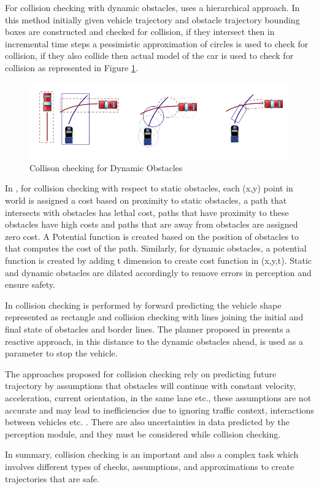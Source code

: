 For collision checking with dynamic obstacles, \cite{kolski_thesis} uses a hierarchical approach. In this method initially given vehicle trajectory and obstacle trajectory bounding boxes are constructed and checked for collision, if they intersect then in incremental time steps a pessimistic approximation of circles is used to check for collision, if they also collide then actual model of the car is used to check for collision as represented in Figure \ref{kolskidynamicobst}.

\begin{figure}
	\centering
	\includegraphics[width=1.0\textwidth]{Images/related_work/kolskidynamicobstacles.png}
	\caption{Collison checking for Dynamic Obstacles \cite{kolski_thesis}}
	\label{kolskidynamicobst}
\end{figure} 

In \cite{cmu_parallel_thesis}, for collision checking with respect to static obstacles, each (x,y) point in world is assigned a cost based on proximity to static obstacles, a path that intersects with obstacles has lethal cost, paths that have proximity to these obstacles have high costs and paths that are away from obstacles are assigned zero cost. A Potential function is created based on the position of obstacles to that computes the cost of the path. Similarly, for dynamic obstacles, a potential function is created by adding t dimension to create cost function in (x,y,t). Static and dynamic obstacles are dilated accordingly to remove errors in perception and ensure safety.


In \cite{rrt_star} collision checking is performed by forward predicting the vehicle shape represented as rectangle and collision checking with lines joining the initial and final state of obstacles and border lines. The planner proposed in \cite{volvo_reactive_traj} presents a reactive approach, in this distance to the dynamic obstacles ahead, is used as a parameter to stop the vehicle.

The approaches proposed for collision checking rely on predicting future trajectory by assumptions that obstacles will continue with constant velocity, acceleration, current orientation, in the same lane etc., these assumptions are not accurate and may lead to inefficiencies due to ignoring traffic context, interactions between vehicles etc. \cite{motion_planning_techniques}. There are also uncertainties in data predicted by the perception module, and they must be considered while collision checking.

In summary, collision checking is an important and also a complex task which involves different types of checks, assumptions, and approximations to create trajectories that are safe.


